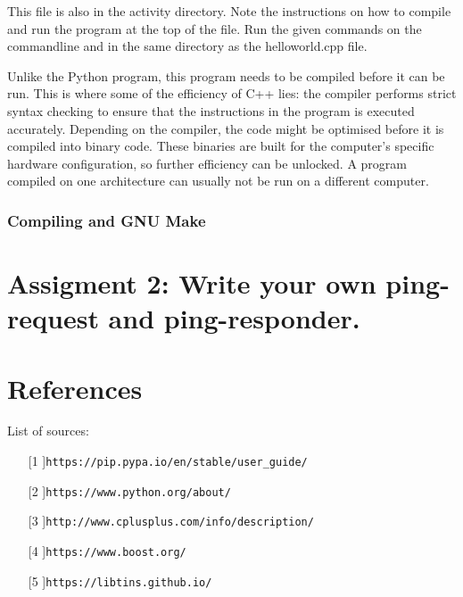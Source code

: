 \documentclass[a4paper]{article}
\begin{document}
This file is also in the activity directory. Note the instructions on how to compile and run the program at the top of the file. Run the given commands on the commandline and in the same directory as the helloworld.cpp file.

Unlike the Python program, this program needs to be compiled before it can be run. This is where some of the efficiency of C++ lies: the compiler performs strict syntax checking to ensure that the instructions in the program is executed accurately. Depending on the compiler, the code might be optimised before it is compiled into binary code. These binaries are built for the computer's specific hardware configuration, so further efficiency can be unlocked. A program compiled on one architecture can usually not be run on a different computer. 

\subsubsection{Compiling and GNU Make}



\section{Assigment 2: Write your own ping-request and ping-responder. }


\section{References}

List of sources:

\begin{enumerate}

    \item[[1]]{\verb|https://pip.pypa.io/en/stable/user_guide/|}
    \item[[2]]{\verb|https://www.python.org/about/|}
    \item[[3]]{\verb|http://www.cplusplus.com/info/description/|}
    \item[[4]]{\verb|https://www.boost.org/|}
    \item[[5]]{\verb|https://libtins.github.io/|}
    
\end{enumerate}
\end{document}

